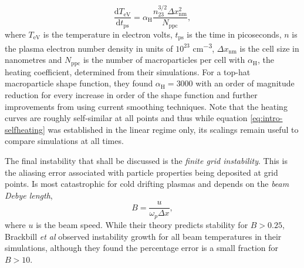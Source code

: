 \begin{equation}\label{eq:intro-selfheating}
	\frac{\mathrm{d} T_\mathrm{eV}}{\mathrm{d}t_\mathrm{ps}} = \alpha_\mathrm{H} \frac{n^{3/2}_{23} \Delta x^2_\mathrm{nm}}{N_\mathrm{ppc}},
\end{equation}
where $T_\mathrm{eV}$ is the temperature in electron volts, $t_\mathrm{ps}$ is the time in picoseconds, $n$ is the plasma electron number density in units of $10^{23}$ \unit{cm^{-3}}, $\Delta x_\mathrm{nm}$ is the cell size in nanometres and $N_\mathrm{ppc}$ is the number of macroparticles per cell with $\alpha_\mathrm{H}$, the heating coefficient, determined from their simulations. For a top-hat macroparticle shape function, they found $\alpha_\mathrm{H} = 3000$ with an order of magnitude reduction for every increase in order of the shape function and further improvements from using current smoothing techniques. Note that the heating curves are roughly self-similar at all points and thus while equation \ref{eq:intro-selfheating} was established in the linear regime only, its scalings remain useful to compare simulations at all times.

The final instability that shall be discussed is the \textit{finite grid instability}. This is the aliasing error associated with particle properties being deposited at grid points. Is most catastrophic for cold drifting plasmas and depends on the \textit{beam Debye length},
\begin{equation}
	B = \frac{u}{\omega_p \Delta x},
\end{equation}
where $u$ is the beam speed. While their theory predicts stability for $B > 0.25$, Brackbill \textit{et al} \cite{brackbillEnergyMomentumConservation2016} observed instability growth for all beam temperatures in their simulations, although they found the percentage error is a small fraction for $B>10$.

